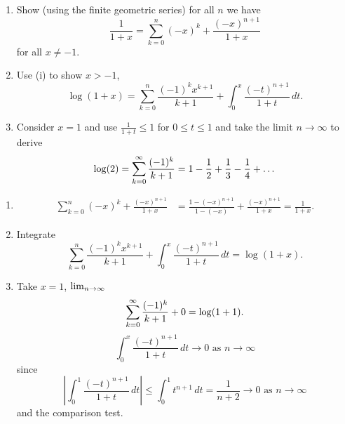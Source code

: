 \documentclass[10pt, a4paper]{article}
\begin{document}
\begin{problem}
    \begin{enumerate}[label = (\roman*)]
        \item Show
        (using the finite geometric series)
        for all $n$ we have
        \[
        \frac{1}{1 + x} = \sum_{k = 0}^{n}(-x) ^ k + \frac{(-x) ^ {n + 1}}{1 + x}
        \]
        for all $x \neq -1$.

        \item Use (i) to show $x > -1$,
        \[
        \log(1 + x) = \sum_{k = 0}^{n}\frac{(-1) ^ kx ^ {k + 1}}{k + 1} + \int_{0}^{x}\frac{(-t) ^ {n + 1}}{1 + t}\,dt.
        \]

        \item Consider $x = 1$ and use $\frac{1}{1 + t} \leq 1$ for $0 \leq t \leq 1$ and take the limit $n \to \infty$ to derive
        \[
        \log(2) = \sum_{k = 0}^{\infty}\frac{(-1) ^ k}{k + 1} = 1 - \frac{1}{2} + \frac{1}{3} - \frac{1}{4} + \dotsc
        \]
    \end{enumerate}

    \begin{solution}
        \begin{enumerate}[label = (\roman*)]
            \item
            \begin{align*}
                \sum_{k = 0}^{n}(-x) ^ k + \frac{(-x) ^ {n + 1}}{1 + x} &= \frac{1 - (-x) ^ {n + 1}}{1 - (-x)} + \frac{(-x) ^ {n + 1}}{1 + x} = \frac{1}{1 + x}.
            \end{align*}

            \item
            Integrate
            \[
            \sum_{k = 0}^{n}\frac{(-1) ^ kx ^ {k + 1}}{k + 1} + \int_{0}^{x}\frac{(-t) ^ {n + 1}}{1 + t}\,dt = \log(1 + x).
            \]

            \item
            Take $x = 1$,
            $\lim_{n \rightarrow \infty}$
            \[
            \sum_{k = 0}^{\infty}\frac{(-1) ^ k}{k + 1} + 0 = \log(1 + 1).
            \]
            \[
            \int_{0}^{x}\frac{(-t) ^ {n + 1}}{1 + t}\,dt \to 0\text{ as } n \to \infty
            \]
            since
            \[
            \left|\int_{0}^{1}\frac{(-t) ^ {n + 1}}{1 + t}\,dt\right| \leq \int_{0}^{1}t ^ {n + 1}\,dt = \frac{1}{n + 2} \to 0\text{ as } n \to \infty
            \]
            and the comparison test.
        \end{enumerate}
    \end{solution}
\end{problem}
\end{document}
